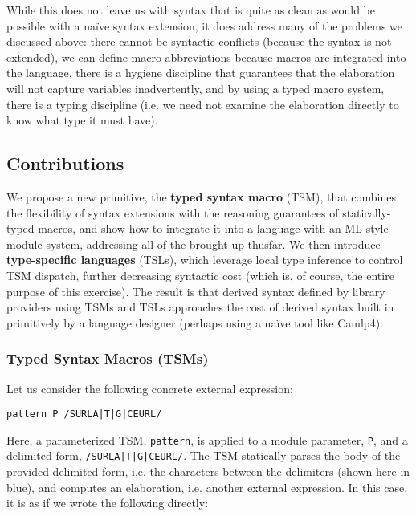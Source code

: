 While this does not leave us with syntax that is quite as clean as would be possible with a  na\"ive syntax extension,  it does address many of the problems we discussed above: there cannot be syntactic conflicts (because the syntax is not extended), we can define macro abbreviations because macros are integrated into the language, there is a hygiene discipline that guarantees that the elaboration will not capture variables inadvertently, and by using a typed macro system, there is a typing discipline (i.e. we need not examine the elaboration directly to know what type it must have). 


\subsection{Contributions}\label{sec:syntax-contributions}
We propose a new primitive, the \textbf{typed syntax macro} (TSM), that combines the flexibility of syntax extensions with the reasoning guarantees of statically-typed macros, and show how to integrate it into a language with an ML-style module system, addressing all of the brought up thusfar. 
We then introduce \textbf{type-specific languages} (TSLs), which leverage local type inference to control TSM dispatch, further decreasing syntactic cost (which is, of course, the entire purpose of this exercise). The result is that derived syntax defined by library providers using TSMs and TSLs  approaches the cost of derived syntax built in primitively by a language designer (perhaps using a na\"ive tool like Camlp4).

\subsubsection{Typed Syntax Macros (TSMs)}
Let us consider the following concrete external expression:
\begin{lstlisting}[numbers=none]
pattern P /SURLA|T|G|CEURL/
\end{lstlisting}
Here, a parameterized TSM, \lstinline{pattern}, is applied to a module parameter, \lstinline{P}, and a {delimited form}, \lstinline{/SURLA|T|G|CEURL/}. The TSM statically parses the body of the provided delimited form, i.e. the characters between the delimiters (shown here in blue), and computes an elaboration, i.e. another external expression. In this case, it is as if we wrote the following directly:

